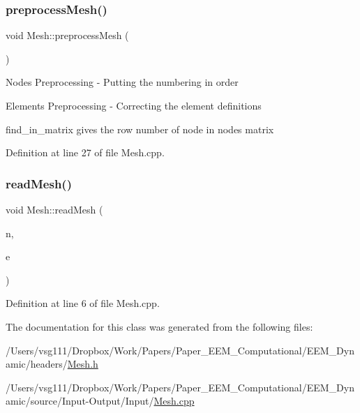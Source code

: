 \mbox{\label{class_mesh_aa8a6f260e9589be4c0a2fcc146e696d5}} 
\subsubsection{\texorpdfstring{preprocess\+Mesh()}{preprocessMesh()}}
{\footnotesize\ttfamily void Mesh\+::preprocess\+Mesh (\begin{DoxyParamCaption}\item[{void}]{ }\end{DoxyParamCaption})}

Nodes Preprocessing -\/ Putting the numbering in order

Elements Preprocessing -\/ Correcting the element definitions

find\+\_\+in\+\_\+matrix gives the row number of node in nodes matrix 

Definition at line 27 of file Mesh.\+cpp.

\mbox{\label{class_mesh_a2e0931c78a7ef01ccc9bf8f0dd74afb0}} 
\subsubsection{\texorpdfstring{read\+Mesh()}{readMesh()}}
{\footnotesize\ttfamily void Mesh\+::read\+Mesh (\begin{DoxyParamCaption}\item[{Matrix\+Xd}]{n,  }\item[{Matrix\+Xd}]{e }\end{DoxyParamCaption})}



Definition at line 6 of file Mesh.\+cpp.



The documentation for this class was generated from the following files\+:\begin{DoxyCompactItemize}
\item 
/\+Users/vsg111/\+Dropbox/\+Work/\+Papers/\+Paper\+\_\+\+E\+E\+M\+\_\+\+Computational/\+E\+E\+M\+\_\+\+Dynamic/headers/\hyperlink{_mesh_8h}{Mesh.\+h}\item 
/\+Users/vsg111/\+Dropbox/\+Work/\+Papers/\+Paper\+\_\+\+E\+E\+M\+\_\+\+Computational/\+E\+E\+M\+\_\+\+Dynamic/source/\+Input-\/\+Output/\+Input/\hyperlink{_mesh_8cpp}{Mesh.\+cpp}\end{DoxyCompactItemize}
